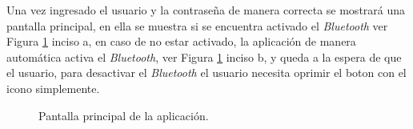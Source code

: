 Una vez ingresado el usuario y la contraseña de manera correcta se mostrará una pantalla principal, en ella se muestra si se encuentra activado el \textit{Bluetooth} ver Figura \ref{principal} inciso a, en caso de no estar activado, la aplicación de manera automática activa el \textit{Bluetooth}, ver Figura \ref{principal} inciso b, y queda a la espera de que el usuario, para desactivar el \textit{Bluetooth} el usuario necesita oprimir el boton con el icono simplemente.\\

\begin{figure}[H]
\centering
{}\hspace{5mm}
\hspace{5mm}
\caption{Pantalla principal de la aplicación.}
\label{principal}
\end{figure}

